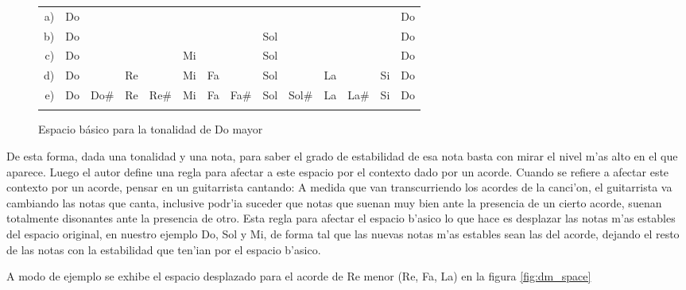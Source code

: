\begin{figure}
\begin{center}
\begin{tabular}{r c c c c c c c c c c c c c} 
a) & Do &      &    &      &    &    &      &     &       &    &      &    & Do\\
b) & Do &      &    &      &    &    &      & Sol &       &    &      &    & Do\\
c) & Do &      &    &      & Mi &    &      & Sol &       &    &      &    & Do\\
d) & Do &      & Re &      & Mi & Fa &      & Sol &       & La &      & Si & Do\\
e) & Do & Do\# & Re & Re\# & Mi & Fa & Fa\# & Sol & Sol\# & La & La\# & Si & Do\\
\newline
\end{tabular}
\caption{ Espacio b\'asico para la tonalidad de Do mayor}
\label{fig:basic_space}
\end{center}
\end{figure}


De esta forma, dada una tonalidad y una nota, para saber el grado de estabilidad de esa nota basta con mirar el nivel m'as alto en el que aparece.
Luego el autor define una regla para afectar a este espacio por el contexto dado por un acorde. Cuando se refiere a afectar este contexto por un acorde, pensar
en un guitarrista cantando: A medida que van transcurriendo los acordes de la canci'on, el guitarrista va cambiando las notas que canta, inclusive podr'ia
suceder que notas que suenan muy bien ante la presencia de un cierto acorde, suenan totalmente disonantes ante la presencia de otro. 
Esta regla para afectar el espacio b'asico lo que hace es desplazar las notas m'as estables del espacio original, en nuestro ejemplo Do, Sol y Mi, de forma tal
que las nuevas notas m'as estables sean las del acorde, dejando el resto de las notas con la estabilidad que ten'ian por el espacio b'asico. 

A modo de ejemplo se exhibe el espacio desplazado para el acorde de Re menor (Re, Fa, La) en la figura \ref{fig:dm_space}


